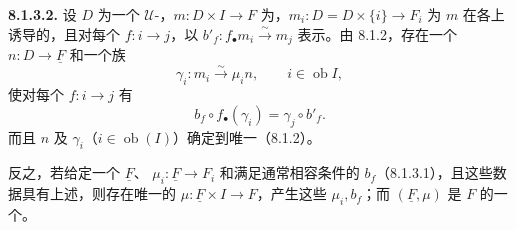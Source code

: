 \textbf{8.1.3.2.} 设 $D$ 为一个 $\mathcal U$-，$m:D\times I\to F$ 为，$m_i:D=D\times\{i\}\to F_i$ 为 $m$ 在各上诱导的，且对每个 $f:i\to j$，以 $b'_f:f_\bullet m_i\xrightarrow\sim m_j$ 表示。由 8.1.2，存在一个 $n:D\to\underline F$ 和一个族
\[\gamma_i:m_i\xrightarrow\sim\mu_in,\qquad i\in\operatorname{ob}I,\]
使对每个 $f:i\to j$ 有
\[b_f\circ f_\bullet(\gamma_i)=\gamma_j\circ b'_f.\]
而且 $n$ 及 $\gamma_i$（$i\in\operatorname{ob}(I)$）确定到唯一（8.1.2）。

反之，若给定一个 $\underline F$、 $\mu_i:\underline F\to F_i$ 和满足通常相容条件的 $b_f$（8.1.3.1），且这些数据具有上述，则存在唯一的 $\mu:\underline F\times I\to F$，产生这些 $\mu_i,b_f$；而 $(\underline F,\mu)$ 是 $F$ 的一个。

